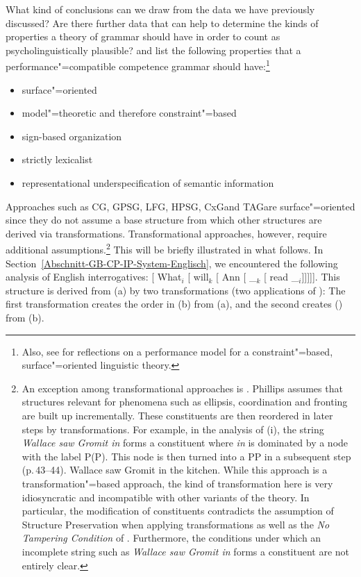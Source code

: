 What kind of conclusions can we draw from the data we have previously discussed? Are there further data that can help to determine the kinds
of properties a theory of grammar should have in order to count as psycholinguistically plausible? \citet*{SWB2003a} and \citet{SW2011a,SW2015a}
list the following properties that a performance"=compatible competence grammar should have:\footnote{
  Also, see  for reflections on a performance model for a constraint"=based, surface"=oriented linguistic
  theory.
}
\begin{itemize}
\item surface"=oriented
\item model"=theoretic and therefore constraint"=based
\item sign-based organization
\item strictly lexicalist
\item representational underspecification of semantic information
\end{itemize}

\noindent
Approaches such as CG\indexcg, GPSG\indexgpsg, LFG\indexlfg, HPSG\indexhpsg, CxG\indexcxg and TAG\indextag are surface"=oriented
since they do not assume a base structure from which other structures are derived via transformations. Transformational
approaches, however, require additional assumptions.\footnote{
	An exception among transformational approaches is . Phillips assumes that structures relevant for phenomena such as ellipsis,
	coordination and fronting
	are built up incrementally. These constituents are then reordered in later steps by transformations. For example, in the analysis of (i), the string
	\emph{Wallace saw Gromit in} forms a constituent where \emph{in} is dominated by a node with the label P(P). This node is then turned into a PP
	in a subsequent step (p.\,43--44).
\ea
Wallace saw Gromit in the kitchen.
\z
While this approach is a transformation"=based approach, the kind of transformation here is very idiosyncratic and incompatible with other
variants of the theory. In particular, the modification of constituents contradicts the assumption of Structure Preservation
when applying transformations as well as the \emph{No
  Tampering Condition} of \citet{Chomsky2008a}. 
Furthermore, the conditions under which an incomplete string such as \emph{Wallace saw Gromit in} forms a constituent are not
entirely clear.
%
} 
This will be briefly illustrated in what follows.
In Section~\ref{Abschnitt-GB-CP-IP-System-Englisch}, we encountered the following analysis of English interrogatives:
\ea
{}[ What$_i$ [ will$_k$ [ Ann [ \_$_k$ [ read \_$_i$]]]]].
\z
This structure is derived from (a) by two transformations (two applications of \movea):
\eal
{}
\zl
The first transformation creates the order in (b) from (a), and the second creates () from 
(b).

